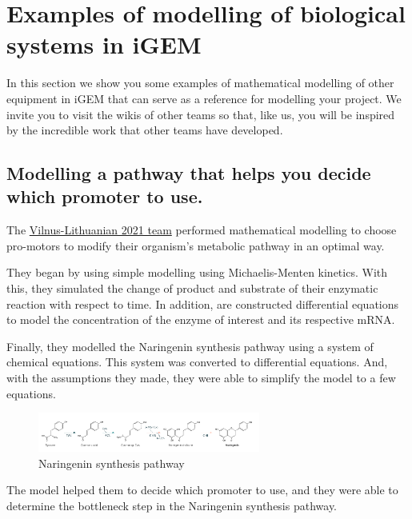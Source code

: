 \documentclass[11pt, letterpaper, english]{article}
\begin{document}
  \newpage  
  


    
  

    
\newpage

\section{Examples of modelling of biological systems in iGEM}
\par{In this section we show you some examples of mathematical modelling of other equipment in iGEM that can serve as a reference for modelling your project. We invite you to visit the wikis of other teams so that, like us, you will be inspired by the incredible work that other teams have developed.}
    \subsection{Modelling a pathway that helps you decide which promoter to use.}
        \par{The \href{https://2021.igem.org/Team:Vilnius-Lithuania/Model}{Vilnus-Lithuanian 2021 team} performed mathematical modelling to choose pro-motors to modify their organism's metabolic pathway in an optimal way.}
        \par{They began by using simple modelling using Michaelis-Menten kinetics. With this, they simulated the change of product and substrate of their enzymatic reaction with respect to time. In addition, are constructed differential equations to model the concentration of the enzyme of interest and its respective mRNA.}
        \par{Finally, they modelled the Naringenin synthesis pathway using a system of chemical equations. This system was converted to differential equations. And, with the assumptions they made, they were able to simplify the model to a few equations.}
        \begin{figure}
	    \centering
		\caption{Naringenin synthesis pathway}
		\includegraphics[width=0.65\textwidth]{Vilnus.png}
	\end{figure}
\par{The model helped them to decide which promoter to use, and they were able to determine the bottleneck step in the Naringenin synthesis pathway.}
\end{document}
